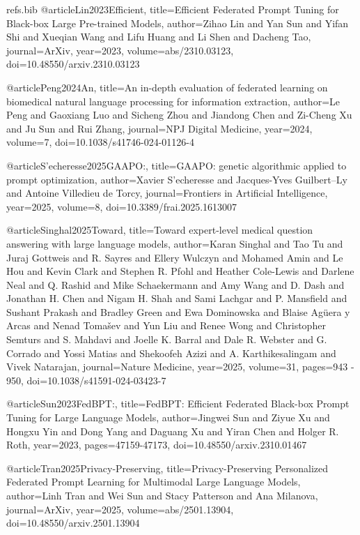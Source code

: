 \begin{filecontents}{refs.bib}
@article{Lin2023Efficient,
title={Efficient Federated Prompt Tuning for Black-box Large Pre-trained Models},
author={Zihao Lin and Yan Sun and Yifan Shi and Xueqian Wang and Lifu Huang and Li Shen and Dacheng Tao},
journal={ArXiv},
year={2023},
volume={abs/2310.03123},
doi={10.48550/arxiv.2310.03123}
}

@article{Peng2024An,
title={An in-depth evaluation of federated learning on biomedical natural language processing for information extraction},
author={Le Peng and Gaoxiang Luo and Sicheng Zhou and Jiandong Chen and Zi-Cheng Xu and Ju Sun and Rui Zhang},
journal={NPJ Digital Medicine},
year={2024},
volume={7},
doi={10.1038/s41746-024-01126-4}
}

@article{S'echeresse2025GAAPO:,
title={GAAPO: genetic algorithmic applied to prompt optimization},
author={Xavier S'echeresse and Jacques-Yves Guilbert--Ly and Antoine Villedieu de Torcy},
journal={Frontiers in Artificial Intelligence},
year={2025},
volume={8},
doi={10.3389/frai.2025.1613007}
}

@article{Singhal2025Toward,
title={Toward expert-level medical question answering with large language models},
author={Karan Singhal and Tao Tu and Juraj Gottweis and R. Sayres and Ellery Wulczyn and Mohamed Amin and Le Hou and Kevin Clark and Stephen R. Pfohl and Heather Cole-Lewis and Darlene Neal and Q. Rashid and Mike Schaekermann and Amy Wang and D. Dash and Jonathan H. Chen and Nigam H. Shah and Sami Lachgar and P. Mansfield and Sushant Prakash and Bradley Green and Ewa Dominowska and Blaise Agüera y Arcas and Nenad Tomašev and Yun Liu and Renee Wong and Christopher Semturs and S. Mahdavi and Joelle K. Barral and Dale R. Webster and G. Corrado and Yossi Matias and Shekoofeh Azizi and A. Karthikesalingam and Vivek Natarajan},
journal={Nature Medicine},
year={2025},
volume={31},
pages={943 - 950},
doi={10.1038/s41591-024-03423-7}
}

@article{Sun2023FedBPT:,
title={FedBPT: Efficient Federated Black-box Prompt Tuning for Large Language Models},
author={Jingwei Sun and Ziyue Xu and Hongxu Yin and Dong Yang and Daguang Xu and Yiran Chen and Holger R. Roth},
year={2023},
pages={47159-47173},
doi={10.48550/arxiv.2310.01467}
}

@article{Tran2025Privacy-Preserving,
title={Privacy-Preserving Personalized Federated Prompt Learning for Multimodal Large Language Models},
author={Linh Tran and Wei Sun and Stacy Patterson and Ana Milanova},
journal={ArXiv},
year={2025},
volume={abs/2501.13904},
doi={10.48550/arxiv.2501.13904}
}


\end{filecontents}
